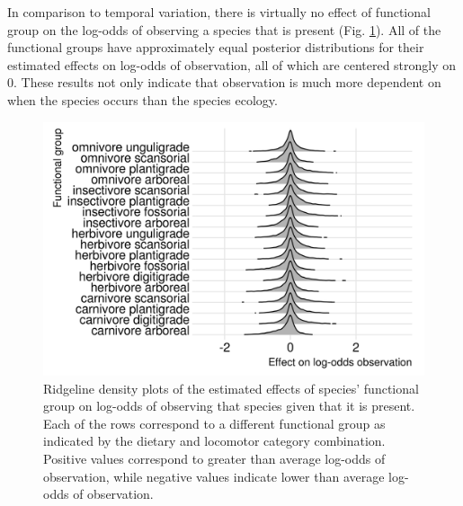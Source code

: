 \documentclass[12pt,letterpaper]{article}
\begin{document}
In comparison to temporal variation, there is virtually no effect of functional group on the log-odds of observing a species that is present (Fig. \ref{fig:fg_observe}). All of the functional groups have approximately equal posterior distributions for their estimated effects on log-odds of observation, all of which are centered strongly on 0. These results not only indicate that observation is much more dependent on when the species occurs than the species ecology.
\begin{figure}[ht]
  \centering
  \includegraphics[width=\textwidth,height=0.4\textheight,keepaspectratio=true]{figure/ecotype_observation}
  \caption{Ridgeline density plots of the estimated effects of species' functional group on log-odds of observing that species given that it is present. Each of the rows correspond to a different functional group as indicated by the dietary and locomotor category combination. Positive values correspond to greater than average log-odds of observation, while negative values indicate lower than average log-odds of observation.}
  \label{fig:fg_observe}
\end{figure}
\end{document}
